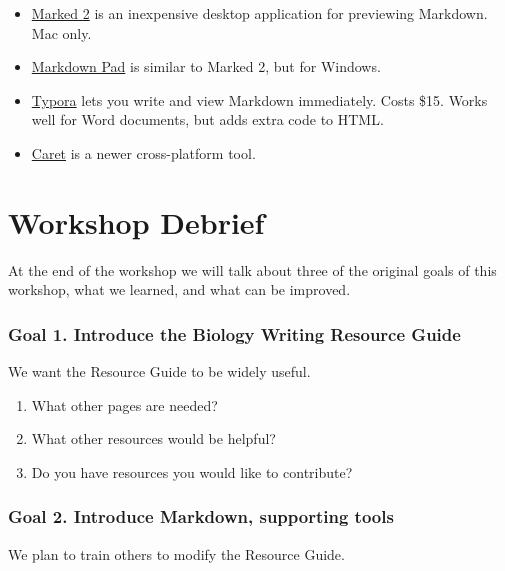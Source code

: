 \documentclass[
]{article}
\providecommand{\tightlist}{%
  \setlength{\itemsep}{0pt}\setlength{\parskip}{0pt}}
\begin{document}
\begin{itemize}
\tightlist
\item
  \href{https://marked2app.com/}{Marked 2} is an inexpensive desktop
  application for previewing Markdown. Mac only.
\item
  \href{http://markdownpad.com/}{Markdown Pad} is similar to Marked 2,
  but for Windows.
\item
  \href{https://typora.io/}{Typora} lets you write and view Markdown
  immediately. Costs \$15. Works well for Word documents, but adds extra
  code to HTML.
\item
  \href{https://caret.io/}{Caret} is a newer cross-platform tool.
\end{itemize}

\hypertarget{workshop-debrief}{%
\section{Workshop Debrief}\label{workshop-debrief}}

At the end of the workshop we will talk about three of the original
goals of this workshop, what we learned, and what can be improved.

\hypertarget{goal-1.-introduce-the-biology-writing-resource-guide}{%
\subsubsection{Goal 1. Introduce the Biology Writing Resource
Guide}\label{goal-1.-introduce-the-biology-writing-resource-guide}}

We want the Resource Guide to be widely useful.

\begin{enumerate}
\def\labelenumi{\arabic{enumi}.}
\tightlist
\item
  What other pages are needed?
\item
  What other resources would be helpful?
\item
  Do you have resources you would like to contribute?
\end{enumerate}

\hypertarget{goal-2.-introduce-markdown-supporting-tools}{%
\subsubsection{Goal 2. Introduce Markdown, supporting
tools}\label{goal-2.-introduce-markdown-supporting-tools}}

We plan to train others to modify the Resource Guide.
\end{document}
